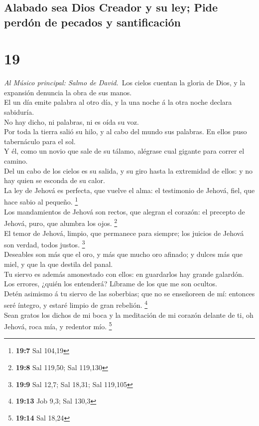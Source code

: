 \hypertarget{alabado-sea-dios-creador-y-su-ley-pide-perduxf3n-de-pecados-y-santificaciuxf3n}{%
\subsection{Alabado sea Dios Creador y su ley; Pide perdón de pecados y
santificación}\label{alabado-sea-dios-creador-y-su-ley-pide-perduxf3n-de-pecados-y-santificaciuxf3n}}

\hypertarget{section-18}{%
\section{19}\label{section-18}}

 \emph{Al Músico principal: Salmo de David.}~Los cielos
cuentan la gloria de Dios, y la expansión denuncia la obra de sus
manos.\\
 El un día emite palabra al otro día, y la una noche á la
otra noche declara sabiduría.\\
 No hay dicho, ni palabras, ni es oída su voz.\\
 Por toda la tierra salió su hilo, y al cabo del mundo sus
palabras. En ellos puso tabernáculo para el sol.\\
 Y él, como un novio que sale de su tálamo, alégrase cual
gigante para correr el camino.\\
 Del un cabo de los cielos es su salida, y su giro hasta la
extremidad de ellos: y no hay quien se esconda de su calor.\\
 La ley de Jehová es perfecta, que vuelve el alma: el
testimonio de Jehová, fiel, que hace sabio al pequeño. \footnote{\textbf{19:7}
  Sal 104,19}\\
 Los mandamientos de Jehová son rectos, que alegran el
corazón: el precepto de Jehová, puro, que alumbra los ojos.
\footnote{\textbf{19:8} Sal 119,50; Sal 119,130}\\
 El temor de Jehová, limpio, que permanece para siempre; los
juicios de Jehová son verdad, todos justos. \footnote{\textbf{19:9} Sal
  12,7; Sal 18,31; Sal 119,105}\\
 Deseables son más que el oro, y más que mucho oro afinado;
y dulces más que miel, y que la que destila del panal.\\
 Tu siervo es además amonestado con ellos: en guardarlos
hay grande galardón.\\
 Los errores, ¿quién los entenderá? Líbrame de los que me
son ocultos.\\
 Detén asimismo á tu siervo de las soberbias; que no se
enseñoreen de mí: entonces seré íntegro, y estaré limpio de gran
rebelión. \footnote{\textbf{19:13} Job 9,3; Sal 130,3}\\
 Sean gratos los dichos de mi boca y la meditación de mi
corazón delante de ti, oh Jehová, roca mía, y redentor mío. \footnote{\textbf{19:14}
  Sal 18,24}


